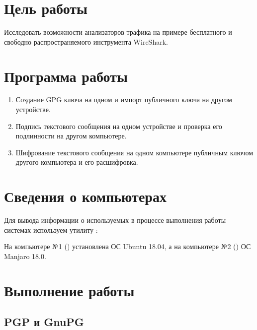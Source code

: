 





\tableofcontents
\newpage

\section{Цель работы}

Исследовать возможности анализаторов трафика на примере бесплатного и свободно распространяемого инструмента WireShark.

\vspace{-0.5em}
\section{Программа работы}

\begin{enumerate}
	\item Создание GPG ключа на одном и импорт публичного ключа на другом устройстве.
	\item Подпись текстового сообщения на одном устройстве и проверка его подлинности на другом компьютере.
	\item Шифрование текстового сообщения на одном компьютере публичным ключом другого компьютера и его расшифровка.
\end{enumerate}

\vspace{-0.5em}
\section{Сведения о компьютерах}

Для вывода информации о используемых в процессе выполнения работы системах используем утилиту :




На компьютере №1 () установлена ОС Ubuntu 18.04, а на компьютере №2 () ОС Manjaro 18.0.

\vspace{-0.5em}
\section{Выполнение работы}

\subsection{PGP и GnuPG}

